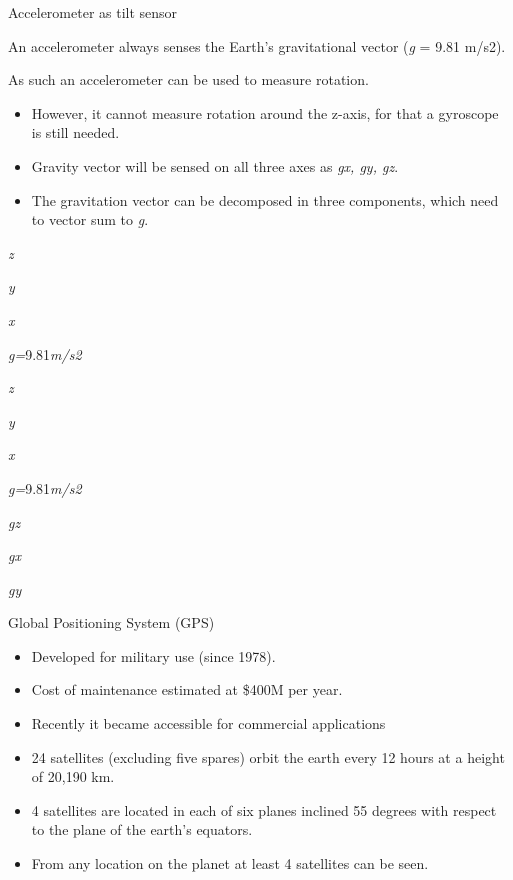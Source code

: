 \documentclass[compress]{beamer}
\providecommand{\tightlist}{%
  \setlength{\itemsep}{0pt}\setlength{\parskip}{0pt}}
\begin{document}
\begin{frame}{Accelerometer as tilt sensor}

An accelerometer always senses the Earth's gravitational vector
(\emph{g} = 9.81 m/s2).

As such an accelerometer can be used to measure rotation.

\begin{itemize}
\tightlist
\item
  However, it cannot measure rotation around the z-axis, for that a
  gyroscope is still needed.
\item
  Gravity vector will be sensed on all three axes as \emph{gx, gy, gz}.
\item
  The gravitation vector can be decomposed in three components, which
  need to vector sum to \emph{g}.
\end{itemize}

\emph{z}

\emph{y}

\emph{x}

\emph{g=}9.81\emph{m/s2}

\emph{z}

\emph{y}

\emph{x}

\emph{g=}9.81\emph{m/s2}

\emph{gz}

\emph{gx}

\emph{gy}

\end{frame}

\begin{frame}{Global Positioning System (GPS)}

\begin{itemize}
\tightlist
\item
  Developed for military use (since 1978).
\item
  Cost of maintenance estimated at \$400M per year.
\item
  Recently it became accessible for commercial applications
\item
  24 satellites (excluding five spares) orbit the earth every 12 hours
  at a height of 20,190 km.
\item
  4 satellites are located in each of six planes inclined 55 degrees
  with respect to the plane of the earth's equators.
\item
  From any location on the planet at least 4 satellites can be seen.
\end{itemize}

\end{frame}
\end{document}
